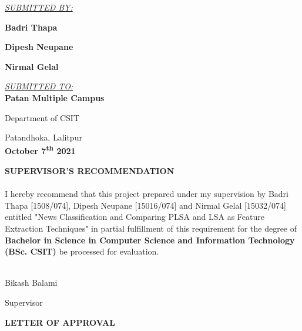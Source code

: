 \documentclass[12pt]{report}
\newcommand{\sigline}[1]{\makebox[\widthof{#1~}]{.\dotfill}\\#1}
\begin{document}
\begin{center}
    \begin{large}
        \underline{\emph{SUBMITTED BY:}}

        \textbf{Badri Thapa}

        \textbf{Dipesh Neupane}
        
        \textbf{Nirmal Gelal}\\[1.2cm]
    \end{large}
    
    \begin{large}
    \underline{\emph{SUBMITTED TO:}}\\[0.13cm]

    \textbf{Patan Multiple Campus}
    \end{large}

    \begin{large}
    Department of CSIT


    
    \end{large}
    Patandhoka, Lalitpur\\[1cm]
    \textbf{October 7\textsuperscript{th} 2021}
    \end{center}
    \newpage
    \begin{center}
    \textbf{SUPERVISOR'S RECOMMENDATION}
    \end{center}
    \paragraph{}
        I hereby recommend that this project prepared under my supervision by Badri Thapa [1508/074], Dipesh Neupane [15016/074] and Nirmal Gelal [15032/074]
        entitled "News Classification and Comparing PLSA and LSA as Feature Extraction Techniques" in partial fulfillment of this requirement for the degree of \textbf{Bachelor in Science in Computer Science and Information Technology (BSc. CSIT)}
        be processed for evaluation. 
        \vspace{3in}

        \begin{center}
           \sigline{Bikash Balami} 
           
           Supervisor
        \end{center}


    \newpage

    \begin{center}
        \textbf{LETTER OF APPROVAL}

        

    \end{center}
\end{document}

